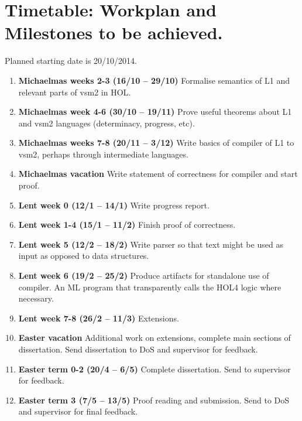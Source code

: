\documentclass[12pt,a4paper,twoside]{article}
\begin{document}
\section*{Timetable: Workplan and Milestones to be achieved.}

Planned starting date is 20/10/2014.

\begin{enumerate}

\item {\bf Michaelmas weeks 2-3 (16/10 -- 29/10)} Formalise semantics of L1 and relevant parts of vsm2 in HOL.

\item {\bf Michaelmas week 4-6 (30/10 -- 19/11)} Prove useful theorems about L1 and vsm2 languages (determinacy, progress, etc).

\item {\bf Michaelmas weeks 7-8 (20/11 -- 3/12)} Write basics of compiler of L1 to vsm2, perhaps
through intermediate languages.

\item {\bf Michaelmas vacation} Write statement of correctness for compiler and start proof.

\item {\bf Lent week 0 (12/1 -- 14/1)} Write progress report.

\item {\bf Lent week 1-4 (15/1 -- 11/2)} Finish proof of correctness.

\item {\bf Lent week 5 (12/2 -- 18/2)} Write parser so that text might be used as input as opposed to
data structures.

\item {\bf Lent week 6 (19/2 -- 25/2)} Produce artifacts for standalone use of compiler. An ML program
that transparently calls the HOL4 logic where necessary.

\item {\bf Lent week 7-8 (26/2 -- 11/3)} Extensions.

\item {\bf Easter vacation} Additional work on extensions, complete main sections of dissertation. Send dissertation to DoS and supervisor for feedback.

\item {\bf Easter term 0-2 (20/4 -- 6/5)} Complete dissertation. Send to supervisor for feedback.

\item {\bf Easter term 3 (7/5 -- 13/5)} Proof reading and submission. Send to DoS and supervisor for final feedback.

\end{enumerate}
\end{document}
